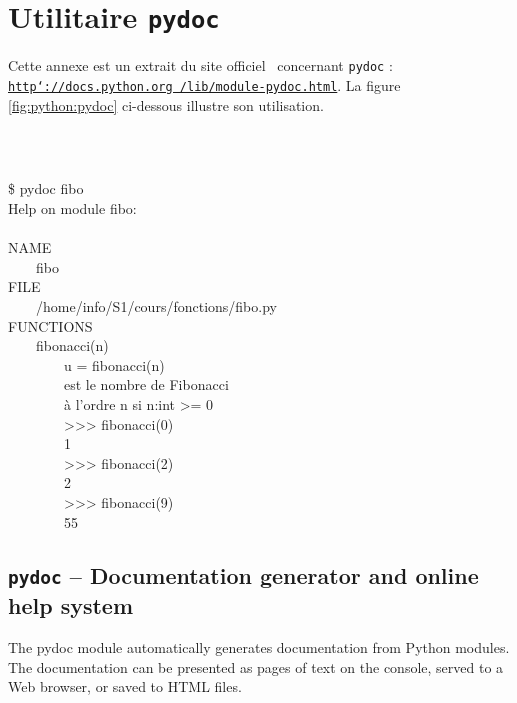 \section{Utilitaire {\tt pydoc}}\label{python:pydoc}
\noindent Cette annexe est un extrait du site officiel \python\ concernant {\tt pydoc} :
\href{http://docs.python.org/lib/module-pydoc.html}{\tt http\char`://docs.python.org /lib/module-pydoc.html}.
La figure \ref{fig:python:pydoc} ci-dessous illustre son utilisation.
\begin{fig}\label{fig:python:pydoc}
\mbox{}\\\tt
\mbox{}\ \ \begin{minipage}{6.5cm}
\$ pydoc fibo\\
Help on module fibo:\\
\mbox{}\\
NAME\\
\mbox{}\ \ \ \ fibo
\mbox{}\\
FILE\\
\mbox{}\ \ \ \ /home/info/S1/cours/fonctions/fibo.py
\mbox{}\\
FUNCTIONS\\
\mbox{}\ \ \ \ fibonacci(n)\\
\mbox{}\ \ \ \ \ \ \ \ u = fibonacci(n) \\
\mbox{}\ \ \ \ \ \ \ \ est le nombre de Fibonacci \\
\mbox{}\ \ \ \ \ \ \ \ à l'ordre n si n:int >= 0 \\
\mbox{}\ \ \ \ \ \ \ \ >>> fibonacci(0)\\
\mbox{}\ \ \ \ \ \ \ \ 1\\
\mbox{}\ \ \ \ \ \ \ \ >>> fibonacci(2)\\
\mbox{}\ \ \ \ \ \ \ \ 2\\
\mbox{}\ \ \ \ \ \ \ \ >>> fibonacci(9)\\
\mbox{}\ \ \ \ \ \ \ \ 55
\end{minipage}
\end{fig}

\subsection*{{\tt pydoc} -- Documentation generator and online help system}
The pydoc module automatically generates documentation from Python modules. 
The documentation can be presented as pages of text on the console, 
served to a Web browser, or saved to HTML files.

